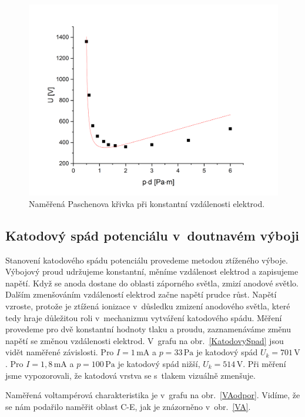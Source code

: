 \documentclass[a4paper,12pt]{article}
\begin{document}
\begin{figure}[h]
	\centering
	\includegraphics[width=130mm]{dfixed.png}
	\caption{Naměřená Paschenova křivka při konstantní vzdálenosti elektrod.}
	\label{dfixed}
\end{figure}

\newpage
\subsection{Katodový spád potenciálu v~doutnavém výboji}
Stanovení katodového spádu potenciálu provedeme metodou ztíženého výboje. 
Výbojový proud udržujeme konstantní, měníme vzdálenost elektrod a zapisujeme 
napětí. Když se anoda dostane do oblasti záporného světla, zmizí anodové 
světlo. Dalším zmenšováním vzdáleností elektrod začne napětí prudce růst. 
Napětí vzroste, protože je ztížená ionizace v~důsledku zmizení anodového 
světla, které tedy hraje důležitou roli v~mechanizmu vytváření katodového 
spádu. Měření provedeme pro dvě konstantní hodnoty tlaku a proudu, 
zaznamenáváme změnu napětí se změnou vzdálenosti elektrod. V~grafu na 
obr.~\ref{KatodovySpad} jsou vidět naměřené závislosti. Pro $I = 
1\,\si{\milli\ampere}$ a $p = 33\,\si{\pascal}$ je katodový spád $U_k = 
701\,\si{\volt}$. Pro $I = 1,8\,\si{\milli\ampere}$ a $p = 100\,\si{\pascal}$ 
je katodový spád nižší,  $U_k = 514\,\si{\volt}$. Při měření jsme vypozorovali, 
že katodová vrstva se s~tlakem vizuálně zmenšuje.


Naměřená voltampérová charakteristika je v~grafu na obr.~\ref{VAodpor}. Vidíme, 
že se nám podařilo naměřit oblast C-E, jak je znázorněno v~obr.~\ref{VA}.
\end{document}
